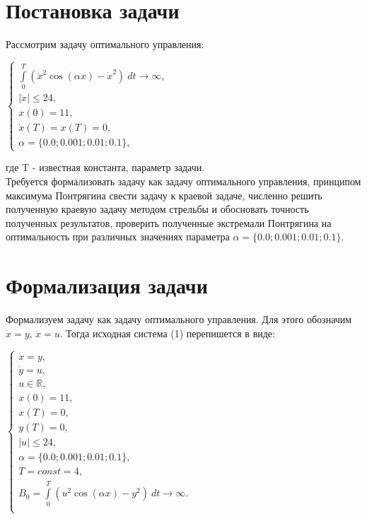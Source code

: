 \documentclass[a4paper,12pt,oneside]{article}
\numberwithin{equation}{section}
\numberwithin{table}{section}
\numberwithin{figure}{section}
\newcommand*\absc[1]{|{#1}|}
\begin{document}
\begin{titlepage}
\textbf{}
\tableofcontents
\end{titlepage}
\newpage


\section{Постановка задачи}
Рассмотрим задачу оптимального управления: \\
\begin{center}
    $
    \begin{cases}
        \int\limits_0^T (\ddot{x}^2 \cos (\alpha x) - \dot{x}^2 )~dt \to \infty ,\\
        \absc{\ddot{x}} \leq 24 ,\\
        x(0) = 11 ,\\
        \dot{x}(T) = x(T) = 0 ,\\
        \alpha = \{ 0.0; 0.001; 0.01; 0.1\} ,
    \end{cases}
    $
\end{center}
где T - известная константа, параметр задачи. \\

Требуется формализовать задачу как задачу оптимального управления, принципом максимума
Понтрягина свести задачу к краевой задаче, численно решить полученную краевую задачу методом
стрельбы и обосновать точность полученных результатов, проверить полученные экстремали Понтрягина на оптимальность при различных значениях параметра $\alpha = \{ 0.0; 0.001; 0.01; 0.1\}$. \\


\section{Формализация задачи}
Формализуем задачу как задачу оптимального управления. Для этого обозначим $\dot{x} = y$, $\ddot{x} = u$.
Тогда исходная система (1) перепишется в виде: \\
\begin{center}
    $
    \begin{cases}
        \dot{x} = y ,\\
        \dot{y} = u ,\\
        u \in \mathbb{R} ,\\
        x(0) = 11 ,\\
        x(T) = 0 ,\\
        y(T) = 0 ,\\
        \absc{u} \leq 24 ,\\
        \alpha = \{ 0.0; 0.001; 0.01; 0.1\} ,\\
        T = const = 4,\\
        B_0 = \int\limits_0^T (u^2 \cos (\alpha x) - y^2 )~dt \to \infty .\\
    \end{cases}
    $
\end{center}
\end{document}
